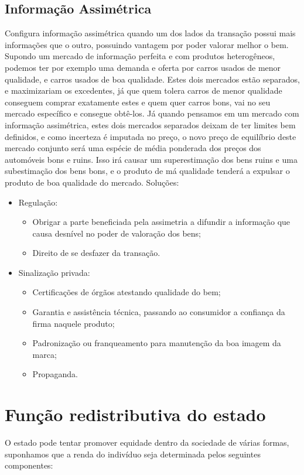 \documentclass[12pt,a4paper,oneside,brazil]{abntex2}
\begin{document}
\subsection{Informação Assimétrica}
Configura informação assimétrica quando um dos lados da transação possui mais informações que o outro, possuindo vantagem por poder valorar melhor o bem. Supondo um mercado de informação perfeita e com produtos heterogêneos, podemos ter por exemplo uma demanda e oferta por carros usados de menor qualidade, e carros usados de boa qualidade. Estes dois mercados estão separados, e maximizariam os excedentes, já que quem tolera carros de menor qualidade conseguem comprar exatamente estes e quem quer carros bons, vai no seu mercado específico e consegue obtê-los. Já quando pensamos em um mercado com informação assimétrica, estes dois mercados separados deixam de ter limites bem definidos, e como incerteza é imputada no preço, o novo preço de equilíbrio deste mercado conjunto será uma espécie de média ponderada dos preços dos automóveis bons e ruins. Isso irá causar um superestimação dos bens ruins e uma subestimação dos bens bons, e o produto de má qualidade tenderá a expulsar o produto de boa qualidade do mercado. \newline
Soluções:
\begin{itemize}
\item Regulação:
\begin{itemize}
\item Obrigar a parte beneficiada pela assimetria a difundir a informação que causa desnível no poder de valoração dos bens;
\item Direito de se desfazer da transação.
\end{itemize}
\item Sinalização privada:
\begin{itemize}
\item Certificações de órgãos atestando qualidade do bem;
\item Garantia e assistência técnica, passando ao consumidor a confiança da firma naquele produto;
\item Padronização ou franqueamento para manutenção da boa imagem da marca;
\item Propaganda.
\end{itemize}
\end{itemize}

\section{Função redistributiva do estado}
O estado pode tentar promover equidade dentro da sociedade de várias formas, suponhamos que a renda do indivíduo seja determinada pelos seguintes componentes:
\end{document}
